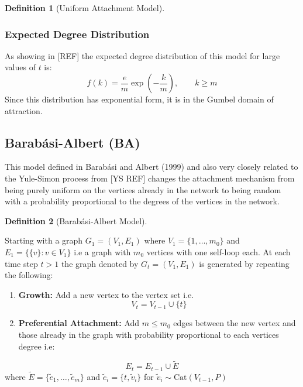 \documentclass[
  10pt,
  a4paper,
]{scrreprt}
\providecommand{\tightlist}{%
  \setlength{\itemsep}{0pt}\setlength{\parskip}{0pt}}\usepackage{longtable,booktabs,array}
\theoremstyle{definition}
\newtheorem{definition}{Definition}[section]
\theoremstyle{plain}
\theoremstyle{remark}
\begin{document}
{\begin{definition}[Uniform Attachment
Model]
\end{definition}

\hypertarget{expected-degree-distribution}{%
\subsubsection{Expected Degree
Distribution}\label{expected-degree-distribution}}

As showing in {[}REF{]} the expected degree distribution of this model
for large values of \(t\) is: \[
f(k) = \frac{e}{m}\exp\left(-\frac{k}{m}\right),\qquad k \ge m
\] Since this distribution has exponential form, it is in the Gumbel
domain of attraction.

\hypertarget{barabuxe1si-albert-ba}{%
\subsection{Barabási-Albert (BA)}\label{barabuxe1si-albert-ba}}

This model defined in Barabási and Albert (1999) and also very closely
related to the Yule-Simon process from {[}YS REF{]} changes the
attachment mechanism from being purely uniform on the vertices already
in the network to being random with a probability proportional to the
degrees of the vertices in the network.

\begin{definition}[Barabási-Albert
Model]\protect\hypertarget{def-ba}{}\label{def-ba}

Starting with a graph \(G_1 = (V_1, E_1)\) where
\(V_1 = \{1,\ldots,m_0\}\) and \(E_1 = \{\{v\}:v\in V_1\}\) i.e a graph
with \(m_0\) vertices with one self-loop each. At each time step \(t>1\)
the graph denoted by \(G_t = (V_1, E_1)\) is generated by repeating the
following:

\begin{enumerate}
\def\labelenumi{\arabic{enumi}.}
\tightlist
\item
  \textbf{Growth:} Add a new vertex to the vertex set i.e. \[
  V_t = V_{t-1} \cup \{t\}
  \]
\item
  \textbf{Preferential Attachment:} Add \(m\le m_0\) edges between the
  new vertex and those already in the graph with probability
  proportional to each vertices degree i.e:
\end{enumerate}

\[
E_t= E_{t-1} \cup \tilde E
\] where \(\tilde E = \{\tilde e_1,\ldots, \tilde e_m\}\) and
\(\tilde e_i = \{t,\tilde v_i\}\) for
\(\tilde v_i \sim \text{Cat}(V_{t-1}, P)\)


\end{definition}}
\end{document}

